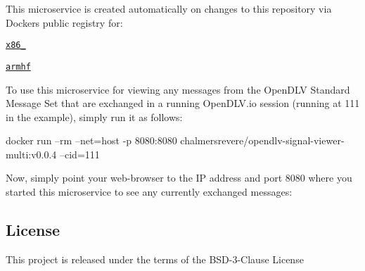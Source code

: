 This microservice is created automatically on changes to this repository via Docker\textquotesingle{}s public registry for\+:
\begin{DoxyItemize}
\item \href{https://hub.docker.com/r/chalmersrevere/opendlv-signal-viewer-amd64/tags/}{\tt x86\+\_}
\item \href{https://hub.docker.com/r/chalmersrevere/opendlv-signal-viewer-armhf/tags/}{\tt armhf}
\end{DoxyItemize}

To use this microservice for viewing any messages from the Open\+D\+LV Standard Message Set that are exchanged in a running Open\+D\+L\+V.\+io session (running at 111 in the example), simply run it as follows\+:


\begin{DoxyCode}
docker run --rm --net=host -p 8080:8080 chalmersrevere/opendlv-signal-viewer-multi:v0.0.4 --cid=111
\end{DoxyCode}


Now, simply point your web-\/browser to the IP address and port 8080 where you started this microservice to see any currently exchanged messages\+:



\subsection*{License}


\begin{DoxyItemize}
\item This project is released under the terms of the B\+S\+D-\/3-\/\+Clause License 
\end{DoxyItemize}